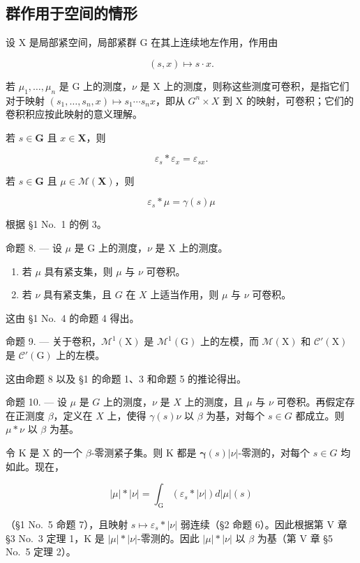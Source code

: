\subsection{群作用于空间的情形}

设 X 是局部紧空间，局部紧群 G 在其上连续地左作用，作用由

\[
(s, x) \mapsto s \cdot x.
\]

若 \(\mu_{1},\ldots,\mu_{n}\) 是 G 上的测度，\(\nu\) 是 X 上的测度，则称这些测度可卷积，是指它们对于映射 \((s_{1},\ldots,s_{n},x)\mapsto s_{1}\cdots s_{n}x\)，即从 \(G^{n}\times X\) 到 X 的映射，可卷积；它们的卷积积应按此映射的意义理解。

若 \(s\in \mathbf{G}\) 且 \(x\in \mathbf{X}\)，则

\[
\varepsilon_ {s} * \varepsilon_ {x} = \varepsilon_ {s x}.\tag{4}
\]

若 \(s \in \mathbf{G}\) 且 \(\mu \in \mathcal{M}(\mathbf{X})\)，则

\[
\varepsilon_ {s} * \mu = \gamma (s) \mu\tag{5}
\]

根据 §1 No.~1 的例 3。

命题 8. --- 设 \(\mu\) 是 G 上的测度，\(\nu\) 是 X 上的测度。

\begin{enumerate}
\def\labelenumi{(\roman{enumi})}
\item
  若 \(\mu\) 具有紧支集，则 \(\mu\) 与 \(\nu\) 可卷积。
\item
  若 \(\nu\) 具有紧支集，且 \(G\) 在 \(X\) 上适当作用，则 \(\mu\) 与 \(\nu\) 可卷积。
\end{enumerate}

这由 §1 No.~4 的命题 4 得出。

命题 9. --- 关于卷积，\(\mathcal{M}^{1}(\mathrm{X})\) 是 \(\mathcal{M}^{1}(\mathrm{G})\) 上的左模，而 \(\mathcal{M}(\mathrm{X})\) 和 \(\mathcal{C}'(\mathrm{X})\) 是 \(\mathcal{C}'(\mathrm{G})\) 上的左模。

这由命题 8 以及 §1 的命题 1、3 和命题 5 的推论得出。

命题 10. --- 设 \(\mu\) 是 \(G\) 上的测度，\(\nu\) 是 \(X\) 上的测度，且 \(\mu\) 与 \(\nu\) 可卷积。再假定存在正测度 \(\beta\)，定义在 \(X\) 上，使得 \(\gamma(s)\nu\) 以 \(\beta\) 为基，对每个 \(s \in G\) 都成立。则 \(\mu * \nu\) 以 \(\beta\) 为基。

令 K 是 X 的一个 \(\beta\)-零测紧子集。则 K 都是 \(\pmb{\gamma}(s)|\nu|\)-零测的，对每个 \(s \in G\) 均如此。现在，

\[
| \mu | * | \nu | = \int_ {\mathrm{G}} (\varepsilon_ {s} * | \nu |) d | \mu | (s)
\]

（§1 No.~5 命题 7），且映射 \(s \mapsto \varepsilon_s * |\nu|\) 弱连续（§2 命题 6）。因此根据第 V 章 §3 No.~3 定理 1，K 是 \(|\mu| * |\nu|\)-零测的。因此 \(|\mu| * |\nu|\) 以 \(\beta\) 为基（第 V 章 §5 No.~5 定理 2）。
\relax{}
